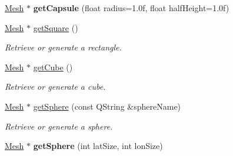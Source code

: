 \begin{Indent}
\begin{DoxyCompactItemize}
\mbox{\hyperlink{classrev_1_1_mesh}{Mesh}} $\ast$ {\bfseries get\+Capsule} (float radius=1.\+0f, float half\+Height=1.\+0f)
\item 
\mbox{\label{classrev_1_1_polygon_cache_a0ab4e8676450b6eb7c0f6270e667712e}} 
\mbox{\hyperlink{classrev_1_1_mesh}{Mesh}} $\ast$ \mbox{\hyperlink{classrev_1_1_polygon_cache_a0ab4e8676450b6eb7c0f6270e667712e}{get\+Square}} ()
\begin{DoxyCompactList}\small\item\em Retrieve or generate a rectangle. \end{DoxyCompactList}\item 
\mbox{\hyperlink{classrev_1_1_mesh}{Mesh}} $\ast$ \mbox{\hyperlink{classrev_1_1_polygon_cache_abe26e97c86b30322ecd6745cec726e4d}{get\+Cube}} ()
\begin{DoxyCompactList}\small\item\em Retrieve or generate a cube. \end{DoxyCompactList}\item 
\mbox{\label{classrev_1_1_polygon_cache_ab0f3acfe761f18662672d22cb5e33988}} 
\mbox{\hyperlink{classrev_1_1_mesh}{Mesh}} $\ast$ \mbox{\hyperlink{classrev_1_1_polygon_cache_ab0f3acfe761f18662672d22cb5e33988}{get\+Sphere}} (const Q\+String \&sphere\+Name)
\begin{DoxyCompactList}\small\item\em Retrieve or generate a sphere. \end{DoxyCompactList}\item 
\mbox{\label{classrev_1_1_polygon_cache_a9712fe5eb77c7331cbc3493f3bc7c5dd}} 
\mbox{\hyperlink{classrev_1_1_mesh}{Mesh}} $\ast$ {\bfseries get\+Sphere} (int lat\+Size, int lon\+Size)
\end{DoxyCompactItemize}
\end{Indent}
